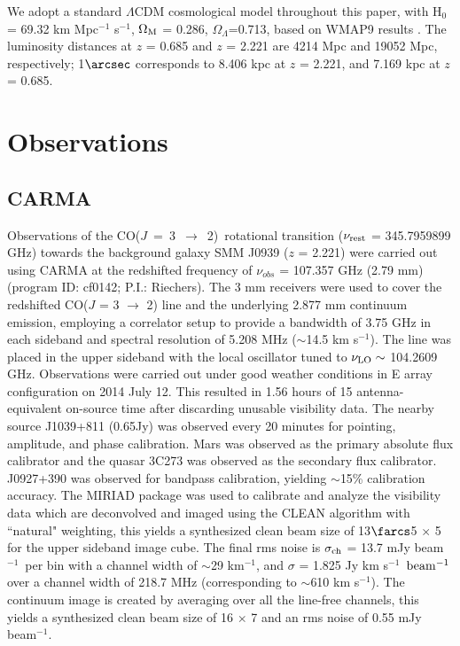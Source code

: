 \documentclass[twocolumn,apj,numberedappendix]{emulateapj}
\newcommand{\CO}{\mbox{CO($J$ = 3 $\rightarrow$ 2) }}
\newcommand{\pmOne}{$^{-1}$}
\begin{document}
We adopt a standard $\Lambda$CDM cosmological model throughout this paper, with H$_0$= 69.32 km Mpc\pmOne
s\pmOne, $\Omega_{\rm M}$ = 0.286, $\Omega_\Lambda$=0.713, based on WMAP9 results \citep{Hinshaw13a}.
The luminosity distances at $z$ = 0.685 and $z$ = 2.221 are 4214 Mpc and 19052 Mpc, respectively; 1$\arcsec$
corresponds to 8.406 kpc at $z$ = 2.221, and 7.169 kpc at $z$ = 0.685.

\section{Observations}\label{sec:obs}
\subsection{CARMA} \label{sec:carmadata}
Observations of the \CO rotational transition ($\nu_{\rm rest}$ = 345.7959899 GHz) towards the background galaxy SMM
J0939 ($z$ = 2.221) were carried out using CARMA at the redshifted frequency of $\nu_{obs}$ = 107.357 GHz (2.79 mm)  (program ID: cf0142; P.I.: Riechers). The 3 mm receivers were used to cover the redshifted CO($J$ = 3 $\rightarrow$ 2) line and the underlying 2.877 mm continuum emission, employing a correlator setup to provide a bandwidth of 3.75 GHz in each sideband and spectral resolution of 5.208 MHz ($\sim$14.5 km s\pmOne). The line was placed in the
upper sideband with the local oscillator tuned to $\nu_{\rm LO}\sim$ 104.2609 GHz.
Observations were carried out under good
weather conditions in E array configuration on 2014 July 12. This resulted in 1.56 hours of 15 antenna-
equivalent on-source time after discarding unusable visibility data.
The nearby source J1039+811 (0.65Jy) was observed every 20 minutes for
pointing, amplitude, and phase calibration. Mars was observed as the primary
absolute flux calibrator and the quasar 3C273 was observed as the secondary
flux calibrator. J0927+390 was observed for bandpass calibration, yielding $\sim
$15\% calibration accuracy.
The {\sc MIRIAD} package was used to calibrate and analyze the visibility data which are deconvolved and imaged using
the CLEAN algorithm with ``natural" weighting, this yields a synthesized clean beam size of 13$\farcs$5 $\times$ 
5 for the upper sideband image cube. The final rms noise is $\sigma_{\rm ch}$ = 13.7 mJy beam\pmOne\ per bin with a channel width of $\sim$29 km\pmOne, and $\sigma$ = 1.825 Jy km s\pmOne\ $\rm beam^{-1}$ over a channel width of 218.7 MHz (corresponding to $\sim$610 km s\pmOne). The continuum image is created by
averaging over all the line-free channels, this yields a synthesized clean beam size of 16 $\times$ 7 and an 
rms noise of 0.55 mJy beam\pmOne.
\end{document}
